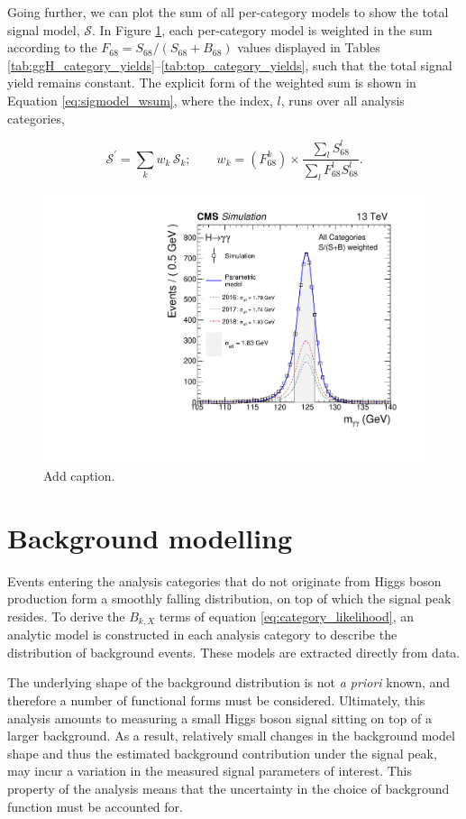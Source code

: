 Going further, we can plot the sum of all per-category models to show the total signal model, $\mathcal{S}$. In Figure \ref{fig:sigmodels_weighted}, each per-category model is weighted in the sum according to the $F_{68} = S_{68}/(S_{68}+B_{68})$ values displayed in Tables \ref{tab:ggH_category_yields}--\ref{tab:top_category_yields}, such that the total signal yield remains constant. The explicit form of the weighted sum is shown in Equation \ref{eq:sigmodel_wsum}, where the index, $l$, runs over all analysis categories,

\begin{equation}\label{eq:sigmodel_wsum}
    \mathcal{S}^' = \sum_k w_k\,\mathcal{S}_k; \qquad w_k = (F^k_{68}) \times \frac{\sum_l S^l_{68}}{\sum_l F^l_{68} S^l_{68}}.
\end{equation}

\begin{figure}[hbtp]
  \centering
  \includegraphics[width=.65\textwidth]{Figures/hgg_stats/smodel_all_weight.pdf}
  \caption[Weighted sum of all signal models]
  {
    Add caption.
  }
  \label{fig:sigmodels_weighted}
\end{figure}

\newpage
\section{Background modelling}\label{sec:bkg_modeling}
Events entering the analysis categories that do not originate from Higgs boson production form a smoothly falling \mgg distribution, on top of which the signal peak resides. To derive the $B_{k,X}$ terms of equation \ref{eq:category_likelihood}, an analytic model is constructed in each analysis category to describe the distribution of background events. These models are extracted directly from data.

The underlying shape of the background distribution is not \textit{a priori} known, and therefore a number of functional forms must be considered. Ultimately, this analysis amounts to measuring a small Higgs boson signal sitting on top of a larger background. As a result, relatively small changes in the background model shape and thus the estimated background contribution under the signal peak, may incur a variation in the measured signal parameters of interest. This property of the analysis means that the uncertainty in the choice of background function must be accounted for.

